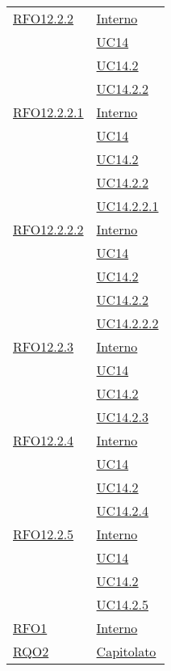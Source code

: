 \begin{longtable}{|>{\centering}m{5cm}|m{5cm}<{\centering}|}
 \hyperlink{RFO12.2.2}{RFO12.2.2} 
 & \hyperlink{Interno}{Interno}\\
& \hyperref[UC14]{UC14}\\
& \hyperref[UC14.2]{UC14.2}\\
& \hyperref[UC14.2.2]{UC14.2.2}\\\hline

 \hyperlink{RFO12.2.2.1}{RFO12.2.2.1} 
 & \hyperlink{Interno}{Interno}\\
& \hyperref[UC14]{UC14}\\
& \hyperref[UC14.2]{UC14.2}\\
& \hyperref[UC14.2.2]{UC14.2.2}\\
& \hyperref[UC14.2.2.1]{UC14.2.2.1}\\\hline

 \hyperlink{RFO12.2.2.2}{RFO12.2.2.2} 
 & \hyperlink{Interno}{Interno}\\
& \hyperref[UC14]{UC14}\\
& \hyperref[UC14.2]{UC14.2}\\
& \hyperref[UC14.2.2]{UC14.2.2}\\
& \hyperref[UC14.2.2.2]{UC14.2.2.2}\\\hline

 \hyperlink{RFO12.2.3}{RFO12.2.3} 
 & \hyperlink{Interno}{Interno}\\
& \hyperref[UC14]{UC14}\\
& \hyperref[UC14.2]{UC14.2}\\
& \hyperref[UC14.2.3]{UC14.2.3}\\\hline

 \hyperlink{RFO12.2.4}{RFO12.2.4} 
 & \hyperlink{Interno}{Interno}\\
& \hyperref[UC14]{UC14}\\
& \hyperref[UC14.2]{UC14.2}\\
& \hyperref[UC14.2.4]{UC14.2.4}\\\hline

 \hyperlink{RFO12.2.5}{RFO12.2.5} 
 & \hyperlink{Interno}{Interno}\\
& \hyperref[UC14]{UC14}\\
& \hyperref[UC14.2]{UC14.2}\\
& \hyperref[UC14.2.5]{UC14.2.5}\\\hline

 \hyperlink{RQO1}{RFO1} 
 & \hyperlink{Interno}{Interno}\\
\hline

 \hyperlink{RQO2}{RQO2} & \hyperlink{Capitolato}{Capitolato}\\
\hline


\end{longtable}
